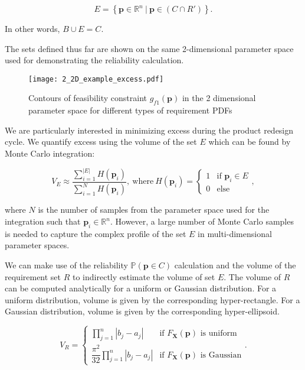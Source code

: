 \begin{equation} \label{eq:excess}
	\textit{E} = \left\{\mathbf{p} \in \mathbb{R}^n~|~\mathbf{p} \in \left(C\cap R'\right) \right\}.
\end{equation}

In other words, $B\cup E = C$.

The sets defined thus far are shown on the same 2-dimensional parameter space used for demonstrating the reliability calculation.

\begin{figure}[h!]
	\centering
	\texttt{[image: 2\_2D\_example\_excess.pdf]}
	\caption{Contours of feasibility constraint $g_{f1}(\mathbf{p})$ in the 2 dimensional parameter space for different types of requirement \acp{PDF}}
	\label{fig:2Dexampleexcess}
\end{figure}

We are particularly interested in minimizing excess during the product redesign cycle. We quantify excess using the volume of the set $E$ which can be found by Monte Carlo integration:

\begin{equation} \label{eq:excessmontecarlo}
	V_E \approx \dfrac{\sum\limits_{i=1}^{|{E}|} H\left(\mathbf{p}_i\right)}{\sum\limits_{i=1}^{N} H\left(\mathbf{p}_i\right)}, ~\mathrm{where}~ H\left(\mathbf{p}_i\right)={\begin{cases}1&{\text{if }}\mathbf{p}_i\in E\\0&{\text{else}}\end{cases}},
\end{equation}

where $N$ is the number of samples from the parameter space used for the integration such that $\mathbf{p}_i \in \mathbb{R}^n$. However, a large number of Monte Carlo samples is needed to capture the complex profile of the set $E$ in multi-dimensional parameter spaces.

We can make use of the reliability $\mathbb{P}(\mathbf{p} \in C)$ calculation and the volume of the requirement set $R$ to indirectly estimate the volume of set $E$. The volume of $R$ can be computed analytically for a uniform or Gaussian distribution. For a uniform distribution, volume is given by the corresponding hyper-rectangle. For a Gaussian distribution, volume is given by the corresponding hyper-ellipsoid.

\begin{equation} \label{eq:Rmontecarlo}
	V_R = {\begin{cases} \prod\limits_{j=1}^{n} \left|b_j - a_j\right| &{\text{if }}F_\mathbf{X}(\mathbf{p})\text{ is uniform}\\\dfrac{\pi^2}{32}\prod\limits_{j=1}^{n} \left|b_j - a_j\right| &{\text{if }}F_\mathbf{X}(\mathbf{p})\text{ is Gaussian}\end{cases}}.
\end{equation}

